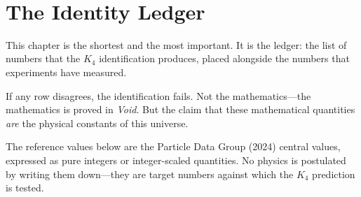 \documentclass[11pt,a4paper]{book}
\begin{document}
\begin{code}
\AgdaOperator{\AgdaPrimitive{*}}\AgdaSpace{}%
%
\>[49]\<%
\\
%
\\[\AgdaEmptyExtraSkip]%
\>[0]\<%
\\
\>[0]\AgdaSpace{}%
\AgdaSymbol{:}\AgdaSpace{}%
\AgdaSpace{}%
\AgdaSpace{}%
\<%
\\
\>[0]\AgdaSpace{}%
\AgdaSymbol{=}\AgdaSpace{}%
\AgdaSymbol{(}\AgdaSpace{}%
\AgdaOperator{\AgdaInductiveConstructor{,}}\AgdaSpace{}%
\AgdaSymbol{)}\<%
\\
%
\\[\AgdaEmptyExtraSkip]%
\>[0]\<%
\\
\>[0]\AgdaSpace{}%
\AgdaSymbol{:}\AgdaSpace{}%
\<%
\\
\>[0]\AgdaSpace{}%
\AgdaSymbol{=}\AgdaSpace{}%
%
\>[37]\<%
\end{code}

\chapter{The Identity Ledger}
\label{ch:identity-ledger}

This chapter is the shortest and the most important. It is the ledger: the list of numbers that the $K_4$ identification produces, placed alongside the numbers that experiments have measured.

If any row disagrees, the identification fails. Not the mathematics---the mathematics is proved in \textit{Void}. But the claim that these mathematical quantities \emph{are} the physical constants of this universe.

The reference values below are the Particle Data Group (2024) central values, expressed as pure integers or integer-scaled quantities. No physics is postulated by writing them down---they are target numbers against which the $K_4$ prediction is tested.
\end{document}
